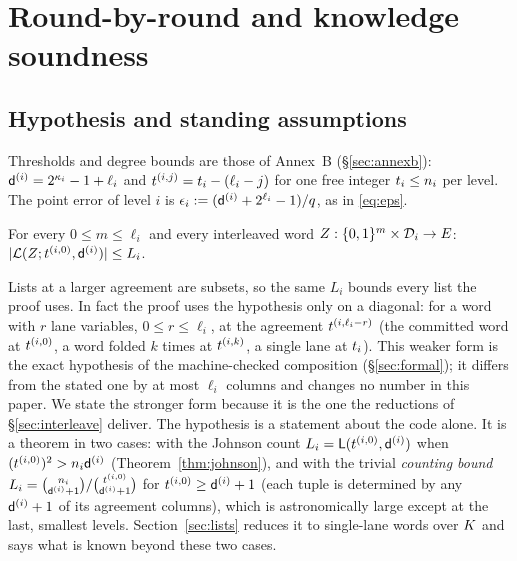 \section{Round-by-round and knowledge soundness}\label{sec:rbr}

\subsection{Hypothesis and standing assumptions}\label{sec:hyp}

Thresholds and degree bounds are those of Annex~B (\S\ref{sec:annexb}): $\mathsf{d}^{(i)}=2^{\kappa_i}-1+\ell_i$ and $t^{(i,j)}=t_i-(\ell_i-j)$ for one free integer $t_i\le n_i$ per level. The point error of level $i$ is $\epsilon_i:=(\mathsf{d}^{(i)}+2^{\ell_i}-1)/q$, as in \eqref{eq:eps}.

\begin{hypothesis}[$\Lb_i(L_i)$]\label{hyp:LB}
For every $0\le m\le\ell_i$ and every interleaved word $Z:\{0,1\}^{m}\times\mathcal{D}_i\to E$: $|\mathcal{L}(Z;t^{(i,0)},\mathsf{d}^{(i)})|\le L_i$.
\end{hypothesis}

Lists at a larger agreement are subsets, so the same $L_i$ bounds every list the proof uses. In fact the proof uses the hypothesis only on a diagonal: for a word with $r$ lane variables, $0\le r\le\ell_i$, at the agreement $t^{(i,\ell_i-r)}$ (the committed word at $t^{(i,0)}$, a word folded $k$ times at $t^{(i,k)}$, a single lane at $t_i$). This weaker form is the exact hypothesis of the machine-checked composition (\S\ref{sec:formal}); it differs from the stated one by at most $\ell_i$ columns and changes no number in this paper. We state the stronger form because it is the one the reductions of \S\ref{sec:interleave} deliver. The hypothesis is a statement about the code alone. It is a theorem in two cases: with the Johnson count $L_i=\mathsf{L}(t^{(i,0)},\mathsf{d}^{(i)})$ when $(t^{(i,0)})^2>n_i\mathsf{d}^{(i)}$ (Theorem~\ref{thm:johnson}), and with the trivial \emph{counting bound} $L_i=\binom{n_i}{\mathsf{d}^{(i)}+1}/\binom{t^{(i,0)}}{\mathsf{d}^{(i)}+1}$ for $t^{(i,0)}\ge\mathsf{d}^{(i)}+1$ (each tuple is determined by any $\mathsf{d}^{(i)}+1$ of its agreement columns), which is astronomically large except at the last, smallest levels. Section~\ref{sec:lists} reduces it to single-lane words over $K$ and says what is known beyond these two cases.

